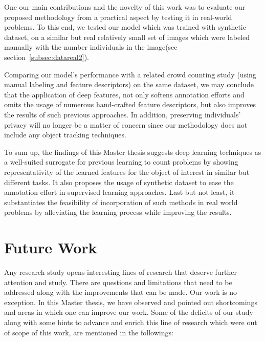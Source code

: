 \indent One our main contributions and the novelty of this work was to evaluate our proposed methodology from a practical aspect by testing it in real-world problems. To this end, we tested our model which was trained with synthetic dataset, on a similar but real relatively small set of images which were labeled manually with the number individuals in the image(see section~\ref{subsec:datareal2}).    

Comparing our model's performance with a related crowd counting study (using manual labeling and feature descriptors) on the same dataset, we may conclude that the application of deep features, not only softens annotation efforts and omits the usage of numerous hand-crafted feature descriptors, but also improves the results of such previous approaches. In addition, preserving individuals' privacy will no longer be a matter of concern since our methodology does not include any object tracking techniques.    

\noindent To sum up, the findings of this Master thesis suggests deep learning techniques as a well-suited surrogate for previous learning to count problems by showing representativity of the learned features for the object of interest in similar but different tasks. It also proposes the usage of synthetic dataset to ease the annotation effort in supervised learning approaches. Last but not least, it substantiates the feasibility of incorporation of such methods in real world problems by alleviating the learning process while improving the results.  

\section{Future Work}

Any research study opens interesting lines of research that deserve further attention and study. There are questions and limitations that need to be addressed along with the improvements that can be made. Our work is no exception. In this Master thesis, we have observed and pointed out shortcomings and areas in which one can improve our work. Some of the deficits of our study along with some hints to advance and enrich this line of research which were out of scope of this work, are mentioned in the followings:

